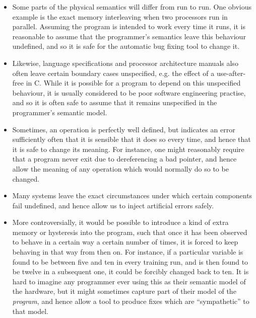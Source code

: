 \begin{itemize}
\item Some parts of the physical semantics will differ from run to
  run.  One obvious example is the exact memory interleaving when two
  processors run in parallel.  Assuming the program is intended to
  work every time it runs, it is reasonable to assume that the
  programmer's semantics leave this behaviour undefined, and so it is
  safe for the automatic bug fixing tool to change it.

\item Likewise, language specifications and processor architecture
  manuals also often leave certain boundary cases unspecified,
  e.g. the effect of a use-after-free in C\cite{Kernighan1988}.  While
  it is possible for a program to depend on this unspecified
  behaviour, it is usually considered to be poor software engineering
  practise\cite{CWE758}, and so it is often safe to assume that it
  remains unspecified in the programmer's semantic model.

\item Sometimes, an operation is perfectly well defined, but indicates
  an error sufficiently often that it is sensible that it does so
  every time, and hence that it is safe to change its meaning.  For
  instance, one might reasonably require that a program never exit due
  to dereferencing a bad pointer, and hence allow the meaning of any
  operation which would normally do so to be changed.

\item Many systems leave the exact circumstances under which certain
  components fail undefined, and hence allow us to inject artificial
  errors safely.

\item More controversially, it would be possible to introduce a kind
  of extra memory or hysteresis into the program, such that once it
  has been observed to behave in a certain way a certain number of
  times, it is forced to keep behaving in that way from then on.  For
  instance, if a particular variable is found to be between five and
  ten in every training run, and is then found to be twelve in a
  subsequent one, it could be forcibly changed back to ten.  It is
  hard to imagine any programmer ever using this as their semantic
  model of the hardware, but it might sometimes capture part of their
  model of the \emph{program}, and hence allow a tool to produce fixes
  which are ``sympathetic'' to that model.
\end{itemize}

